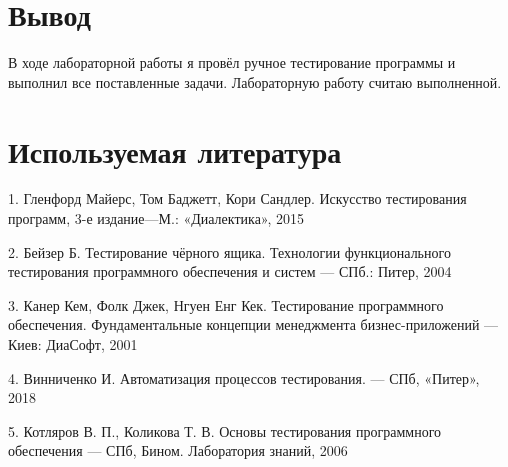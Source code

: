 \documentclass[12pt]{article}
\begin{document}
    \section*{Вывод}

    В ходе лабораторной работы я провёл ручное тестирование программы и выполнил все поставленные задачи. Лабораторную работу считаю выполненной.

    \section*{Используемая литература}

    1. Гленфорд Майерс, Том Баджетт, Кори Сандлер. Искусство тестирования программ, 3-е издание—М.: «Диалектика», 2015

    2. Бейзер Б. Тестирование чёрного ящика. Технологии функционального тестирования программного обеспечения и систем --- СПб.: Питер, 2004

    3. Канер Кем, Фолк Джек, Нгуен Енг Кек. Тестирование программного обеспечения. Фундаментальные концепции менеджмента бизнес-приложений --- Киев: ДиаСофт, 2001

    4. Винниченко И. Автоматизация процессов тестирования. --- СПб, «Питер», 2018

    5. Котляров В. П., Коликова Т. В. Основы тестирования программного обеспечения --- СПб, Бином. Лаборатория знаний, 2006
\end{document}
